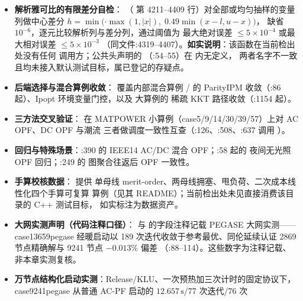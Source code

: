 \begin{itemize}
  \item \textbf{解析雅可比的有限差分自检}：
        （
        第 4211--4409 行）对全部或均匀抽样的变量列做中心差分
        $h=\min($$\cdot\max(1,|x|),\;0.49\min(x-l,u-x))$，
         缺省 $10^{-6}$，逐元比较解析列与差分列，通过阈值为
        最大绝对误差 $\le5\times10^{-4}$ 或最大相对误差 $\le5\times10^{-3}$
        （同文件:4319--4407）。\textbf{如实说明}：该函数在当前检出处没有任何
        调用方；公共头声明的 
        （:54--55）在  内无定义，
        两者名字不一致且均未接入默认测试目标，属已登记的存疑点。
  \item \textbf{后端选择与混合算例收敛}：
        覆盖内部混合算例 / 的 ParityIPM
        收敛（:86 起）、Ipopt 环境变量门控，以及  大算例的
        稀疏 KKT 路径收敛（:1154 起）。
  \item \textbf{三方法交叉验证}：
        在 MATPOWER 小算例（case5/9/14/30/39/57）上对 AC OPF、DC OPF 与潮流
        三者做调度一致性互查（:126、:508、:637 调用 ）。
  \item \textbf{回归与特殊场景}：:390 的
        IEEE14 AC/DC 混合 OPF；:58 起的
        夜间无光照 OPF 回归；:249 的
        图聚合往返后 OPF 一致性。
  \item \textbf{手算校核数据}： 提供
        单母线 merit-order、两母线拥塞、甩负荷、二次成本线性化四个手算可复算
        算例（见其 README）；当前检出处未见直接消费该目录的 C++ 测试目标，
        如实标注为数据资产。
  \item \textbf{大网实测声明（代码注释口径）}： 与
         的字段注释记载 PEGASE 大网实测——
        case13659pegase 经暖启动以 189 次迭代收敛于参考最优、同伦延续认证
        2869 节点精确解与 9241 节点 $-0.013\%$ 偏差
        （:88--114）。这些数字为注释记载、非本章实测复核。
  \item \textbf{万节点结构化启动实测}：Release/KLU、一次预热加三次计时的固定协议下，
        case9241pegase 从普通 AC-PF 启动的 $12.657\,\mathrm{s}$/77 次迭代/76 次

\end{itemize}
